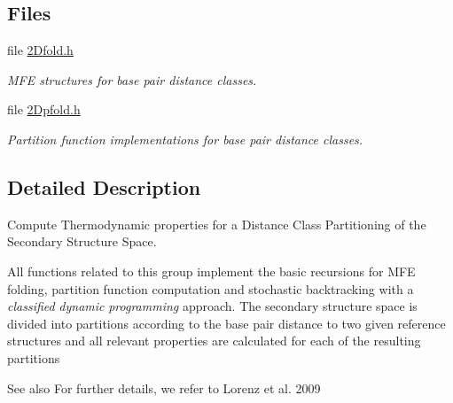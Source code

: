 \subsection*{Files}
\begin{DoxyCompactItemize}
\item 
file \hyperlink{2Dfold_8h}{2\+Dfold.\+h}
\begin{DoxyCompactList}\small\item\em M\+FE structures for base pair distance classes. \end{DoxyCompactList}\item 
file \hyperlink{2Dpfold_8h}{2\+Dpfold.\+h}
\begin{DoxyCompactList}\small\item\em Partition function implementations for base pair distance classes. \end{DoxyCompactList}\end{DoxyCompactItemize}


\subsection{Detailed Description}
Compute Thermodynamic properties for a Distance Class Partitioning of the Secondary Structure Space. 

All functions related to this group implement the basic recursions for M\+FE folding, partition function computation and stochastic backtracking with a {\itshape classified} {\itshape dynamic} {\itshape programming} approach. The secondary structure space is divided into partitions according to the base pair distance to two given reference structures and all relevant properties are calculated for each of the resulting partitions \begin{DoxySeeAlso}{See also}
For further details, we refer to Lorenz et al. 2009 \cite{lorenz:2009} 
\end{DoxySeeAlso}
